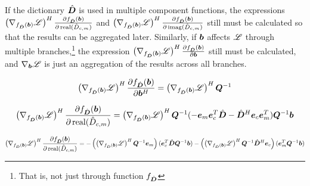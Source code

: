 \begin{appendices}
If the dictionary $\hat{\bm{D}}$ is used in multiple component functions, the expressions $\left(\nabla_{f_{\hat{\bm{D}}}(\bm{b})} \mathscr{L}\right)^H\frac{\partial f_{\hat{\bm{D}}}(\bm{b})}{\partial \operatorname{real}(\hat{D}_{c,m})}$ and $\left(\nabla_{f_{\hat{\bm{D}}}(\bm{b})} \mathscr{L}\right)^H\frac{\partial f_{\hat{\bm{D}}}(\bm{b})}{\partial \operatorname{imag}(\hat{D}_{c,m})}$ still must be calculated so that the results can be aggregated later. Similarly, if $\bm{b}$ affects $\mathscr{L}$ through multiple branches,\footnote{That is, not just through function $f_{\hat{\bm{D}}}$} the expression $\left(\nabla_{f_{\hat{\bm{D}}}(\bm{b})} \mathscr{L}\right)^H\frac{\partial f_{\hat{\bm{D}}}(\bm{b})}{\partial \bm{b}}$ still must be calculated, and $\nabla_{\bm{b}} \mathscr{L}$ is just an aggregation of the results across all branches.

\begin{equation}
\left(\nabla_{f_{\hat{\bm{D}}}(\bm{b})} \mathscr{L}\right)^H\frac{\partial f_{\hat{\bm{D}}}(\bm{b})}{\partial \bm{b}^H} =\left(\nabla_{f_{\hat{\bm{D}}}(\bm{b})} \mathscr{L}\right)^H\bm{Q}^{-1}
\end{equation}

\begin{equation}
\left(\nabla_{f_{\hat{\bm{D}}}(\bm{b})} \mathscr{L}\right)^H\frac{\partial f_{\hat{\bm{D}}}(\bm{b})}{\partial \operatorname{real}(\hat{D}_{c,m})} = \left(\nabla_{f_{\hat{\bm{D}}}(\bm{b})} \mathscr{L}\right)^H\bm{Q}^{-1}(-\bm{e}_m\bm{e}_c^T\hat{\bm{D}} - \hat{\bm{D}}^H\bm{e}_c\bm{e}_m^T)\bm{Q}^{-1}\bm{b}
\end{equation}

\begin{equation}
\left(\nabla_{f_{\hat{\bm{D}}}(\bm{b})} \mathscr{L}\right)^H\frac{\partial f_{\hat{\bm{D}}}(\bm{b})}{\partial \operatorname{real}(\hat{D}_{c,m})} = -\left(\left(\nabla_{f_{\hat{\bm{D}}}(\bm{b})} \mathscr{L}\right)^H\bm{Q}^{-1}\bm{e}_m\right)(\bm{e}_c^T\hat{\bm{D}}\bm{Q}^{-1}\bm{b}) - \left(\left(\nabla_{f_{\hat{\bm{D}}}(\bm{b})} \mathscr{L}\right)^H\bm{Q}^{-1}\hat{\bm{D}}^H\bm{e}_c\right)(\bm{e}_m^T\bm{Q}^{-1}\bm{b})
\end{equation}


\end{appendices}

